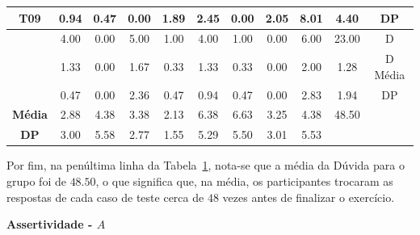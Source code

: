 \begin{table}[htbp]
\begin{tabular}{|c|c|c|c|c|c|c|c|c|cc}
		\multirow{-3}{*}{\cellcolor[HTML]{F2F2F2}\textbf{T09}} & 0.94 & 0.47 & 0.00 & 1.89 & 2.45 & 0.00 & 2.05 & 8.01 & \multicolumn{1}{c|}{4.40} & \multicolumn{1}{c|}{DP} \\ \hline
		\rowcolor[HTML]{D9D9D9} 
		\cellcolor[HTML]{F2F2F2} & 4.00 & 0.00 & 5.00 & 1.00 & 4.00 & 1.00 & 0.00 & 6.00 & \multicolumn{1}{c|}{\cellcolor[HTML]{D9D9D9}23.00} & \multicolumn{1}{c|}{\cellcolor[HTML]{D9D9D9}D} \\ \cline{2-11} 
		\cellcolor[HTML]{F2F2F2} & 1.33 & 0.00 & 1.67 & 0.33 & 1.33 & 0.33 & 0.00 & 2.00 & \multicolumn{1}{c|}{1.28} & \multicolumn{1}{c|}{D Média} \\ \cline{2-11} 
		\rowcolor[HTML]{D9D9D9} 
		\multirow{-3}{*}{\cellcolor[HTML]{F2F2F2}\textbf{T10}} & 0.47 & 0.00 & 2.36 & 0.47 & 0.94 & 0.47 & 0.00 & 2.83 & \multicolumn{1}{c|}{\cellcolor[HTML]{D9D9D9}1.94} & \multicolumn{1}{c|}{\cellcolor[HTML]{D9D9D9}DP} \\ \hline
		\textbf{Média} & 2.88 & 4.38 & 3.38 & 2.13 & 6.38 & 6.63 & 3.25 & 4.38 & \multicolumn{1}{c|}{48.50} & \multicolumn{1}{l}{} \\ \cline{1-10}
		\cellcolor[HTML]{D9D9D9}\textbf{DP} & \cellcolor[HTML]{D9D9D9}3.00 & \cellcolor[HTML]{D9D9D9}5.58 & \cellcolor[HTML]{D9D9D9}2.77 & \cellcolor[HTML]{D9D9D9}1.55 & \cellcolor[HTML]{D9D9D9}5.29 & \cellcolor[HTML]{D9D9D9}5.50 & \cellcolor[HTML]{D9D9D9}3.01 & \cellcolor[HTML]{D9D9D9}5.53 & \multicolumn{1}{l}{} & \multicolumn{1}{l}{} \\ \cline{1-9}
	\end{tabular}
	\label{tab:F3_A2_D_CASOS_}
\end{table}

Por fim, na penúltima linha da Tabela~\ref{tab:F3_A2_D_CASOS_}, nota-se que a média da Dúvida para o grupo foi de $48.50$, o que significa que, na média, os participantes trocaram as respostas de cada caso de teste cerca de $48$ vezes antes de finalizar o exercício.


\textbf{Assertividade - $A$}

